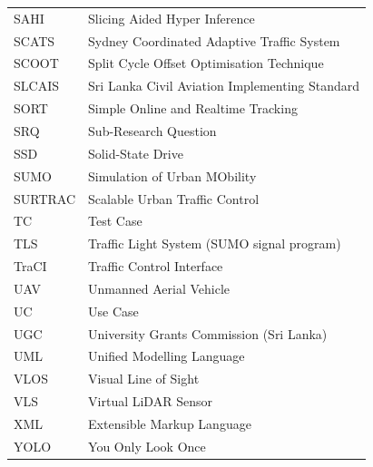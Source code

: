 \begin{longtable}{@{}p{}p{}@{}}
SAHI & Slicing Aided Hyper Inference\\
SCATS & Sydney Coordinated Adaptive Traffic System\\
SCOOT & Split Cycle Offset Optimisation Technique\\
SLCAIS & Sri Lanka Civil Aviation Implementing Standard\\
SORT & Simple Online and Realtime Tracking\\
SRQ & Sub-Research Question\\
SSD & Solid-State Drive\\
SUMO & Simulation of Urban MObility\\
SURTRAC & Scalable Urban Traffic Control\\
TC & Test Case\\
TLS & Traffic Light System (SUMO signal program)\\
TraCI & Traffic Control Interface\\
UAV & Unmanned Aerial Vehicle\\
UC & Use Case\\
UGC & University Grants Commission (Sri Lanka)\\
UML & Unified Modelling Language\\
VLOS & Visual Line of Sight\\
VLS & Virtual LiDAR Sensor\\
XML & Extensible Markup Language\\
YOLO & You Only Look Once\\
\end{longtable}
\renewcommand{\arraystretch}{1.0}
